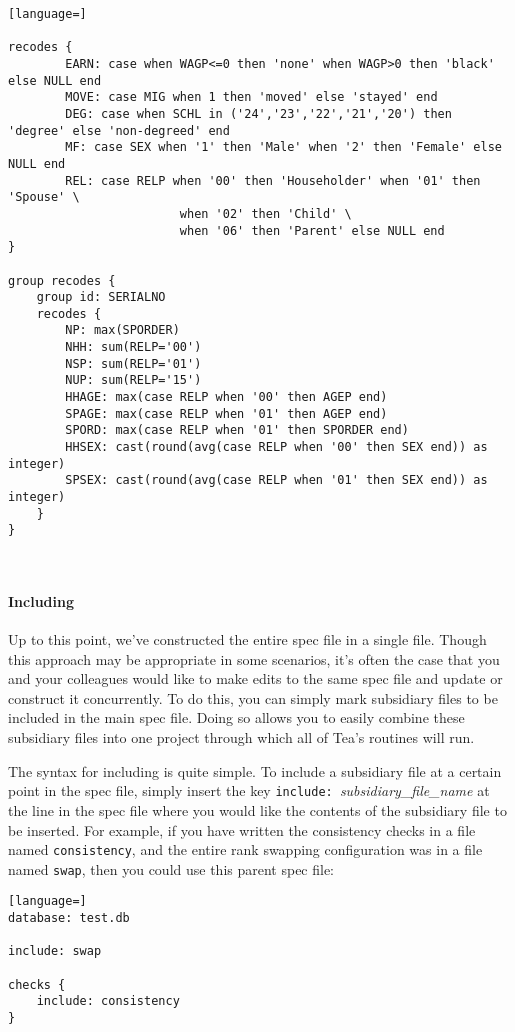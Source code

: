 \documentclass{article}
\begin{document}
\begin{lstlisting}[language=]

recodes {
        EARN: case when WAGP<=0 then 'none' when WAGP>0 then 'black' else NULL end
        MOVE: case MIG when 1 then 'moved' else 'stayed' end
        DEG: case when SCHL in ('24','23','22','21','20') then 'degree' else 'non-degreed' end
        MF: case SEX when '1' then 'Male' when '2' then 'Female' else NULL end
        REL: case RELP when '00' then 'Householder' when '01' then 'Spouse' \
                        when '02' then 'Child' \
                        when '06' then 'Parent' else NULL end
}

group recodes {
    group id: SERIALNO
    recodes {
        NP: max(SPORDER)
        NHH: sum(RELP='00')
        NSP: sum(RELP='01')
        NUP: sum(RELP='15')
        HHAGE: max(case RELP when '00' then AGEP end)
        SPAGE: max(case RELP when '01' then AGEP end)
        SPORD: max(case RELP when '01' then SPORDER end)
        HHSEX: cast(round(avg(case RELP when '00' then SEX end)) as integer)
        SPSEX: cast(round(avg(case RELP when '01' then SEX end)) as integer)
    }
}



\end{lstlisting}

\paragraph{Including} Up to this point, we've constructed the entire spec file in a single file. 
Though this approach may 
be appropriate in some scenarios, it's often the case that you and your colleagues would like to make 
edits to the same spec file and update or construct it concurrently. To do this, you can simply mark 
subsidiary files to be included in the main spec file. Doing so allows you to easily combine these 
subsidiary files into one project through which all of Tea's routines will run.

The syntax for including is quite simple. To include a subsidiary file at a certain point in the spec 
file, simply insert the key {\tt include: }\textit{subsidiary\_file\_name} at the line in the spec 
file where you would like the contents of the subsidiary file to be inserted. For example, if you have 
written the consistency checks in a file named {\tt consistency}, and the entire rank swapping 
configuration was in a file named {\tt swap}, then you could use this parent spec file:

\begin{lstlisting}[language=]
database: test.db

include: swap

checks {
    include: consistency
}
\end{lstlisting}
\end{document}

